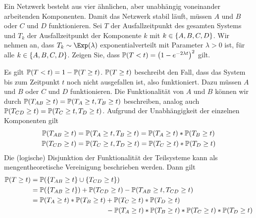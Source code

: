 \begin{exercisePage}
	
	\begin{homework}
		Ein Netzwerk besteht aus vier ähnlichen, aber unabhängig voneinander arbeitenden Komponenten. Damit das Netzwerk stabil läuft, müssen $A$ und $B$ oder $C$ und $D$ funktionieren. Sei $T$ der Ausfallzeitpunkt des gesamten Systems und $T_k$ der Ausfallzeitpunkt der Komponente $k$ mit $k \in \menge{A,B,C,D}$. Wir nehmen an, dass $T_k \sim \Exp(\lambda)$ exponentialverteilt mit Parameter $\lambda > 0$ ist, für alle $k \in \menge{A,B,C,D}$. Zeigen Sie, dass $\P(T<t) = \left( 1 - e^{-2\lambda t} \right)^2$ gilt.
	\end{homework}
	
	
	Es gilt $\P(T < t) = 1 - \P(T \geq t)$. $\P(T \geq t)$ beschreibt den Fall, dass das System bis zum Zeitpunkt $t$ noch nicht ausgefallen ist, also funktioniert. Dazu müssen $A$ und $B$ oder $C$ und $D$ funktionieren. Die Funktionalität von $A$ und $B$ können wir durch $\P(T_{AB} \geq t) = \P(T_A \geq t , T_B \geq t)$ beschreiben, analog auch $\P(T_{CD} \geq t) = \P(T_C \geq t , T_D \geq t)$. Aufgrund der Unabhängigkeit der einzelnen Komponenten gilt
	\begin{equation*}
		\begin{aligned}
		\P(T_{AB} \geq t) &= \P(T_A \geq t , T_B \geq t) = \P(T_A \geq t) * \P(T_B \geq t) \\
		\P(T_{CD} \geq t) &= \P(T_C \geq t , T_D \geq t) = \P(T_C \geq t) * \P(T_D \geq t)
		\end{aligned}
	\end{equation*} 
	Die (logische) Disjunktion der Funktionalität der Teilsysteme kann als mengentheoretische Vereinigung beschrieben werden. Dann gilt
	\begin{equation*}
	\begin{aligned}
		\P(T \geq t) 
		&= \P(\menge{T_{AB} \geq t} \cup \menge{T_{CD} \geq t}) \\
		&= \P(\menge{T_{AB} \geq t}) + \P(T_{CD} \geq t) - \P(T_{AB} \geq t , T_{CD} \geq t) \\
		&= \P(T_A \geq t) * \P(T_B \geq t) + \P(T_C \geq t) * \P(T_D \geq t) \\
		&\phantom{= \P(T_A \geq t) * \P(T_B \geq t) } \,\, - \P(T_A \geq t) * \P(T_B \geq t) * \P(T_C \geq t) * \P(T_D \geq t) \\
	\end{aligned}
	\end{equation*}
	

\end{exercisePage}
